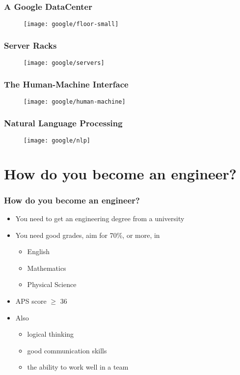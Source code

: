 \documentclass{beamer}
\begin{document}
\begin{frame}
  \frametitle{A Google DataCenter}
  \begin{figure}
  \centering
  \texttt{[image: google/floor-small]}
  \end{figure}
\end{frame}

\begin{frame}
  \frametitle{Server Racks}
  \begin{figure}
  \centering
  \texttt{[image: google/servers]}
  \end{figure}
\end{frame}

\begin{frame}
  \frametitle{The Human-Machine Interface}
  \begin{figure}
  \centering
  \texttt{[image: google/human-machine]}
  \end{figure}
\end{frame}

\begin{frame}
  \frametitle{Natural Language Processing}
  \begin{figure}
  \centering
  \texttt{[image: google/nlp]}
  \end{figure}
\end{frame}

\section{How do you become an engineer?}

\begin{frame}
\frametitle{How do you become an engineer?}
  \begin{itemize}
    \item You need to get an engineering degree from a university
    \item You need good grades, aim for 70\%, or more, in
    \begin{itemize}
      \item English
      \item Mathematics
      \item Physical Science 
    \end{itemize}
    \item APS score $\ge$ 36 
    \item Also 
    \begin{itemize}
       \item logical thinking
       \item good communication skills
       \item the ability to work well in a team
  \end{itemize}
  \end{itemize}
\end{frame}
\end{document}

